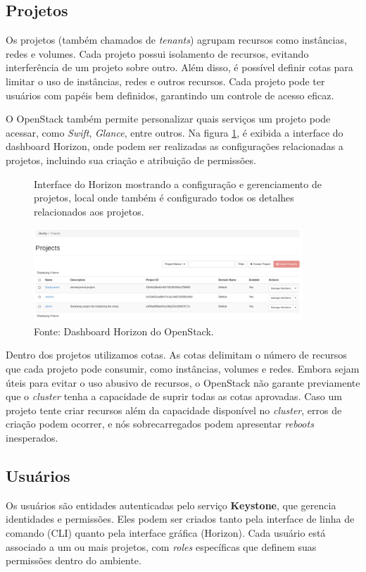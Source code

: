 \subsection{Projetos}
Os projetos (também chamados de \textit{tenants}) agrupam recursos como instâncias, redes e volumes. Cada projeto possui isolamento de recursos, evitando interferência de um projeto sobre outro. Além disso, é possível definir cotas para limitar o uso de instâncias, redes e outros recursos. Cada projeto pode ter usuários com papéis bem definidos, garantindo um controle de acesso eficaz.

O OpenStack também permite personalizar quais serviços um projeto pode acessar, como \textit{Swift}, \textit{Glance}, entre outros. Na figura \ref{fig:openstack_projects}, é exibida a interface do dashboard Horizon, onde podem ser realizadas as configurações relacionadas a projetos, incluindo sua criação e atribuição de permissões.

\begin{figure}[htbp]
    \centering
    \caption{Interface do Horizon mostrando a configuração e gerenciamento de projetos, local onde também é configurado todos os detalhes relacionados aos projetos.}
    \includegraphics[width=0.9\textwidth]{images/openstack_projects.png}
    \caption*{Fonte: Dashboard Horizon do OpenStack.}
    \label{fig:openstack_projects}
\end{figure}

Dentro dos projetos utilizamos cotas. As cotas delimitam o número de recursos que cada projeto pode consumir, como instâncias, volumes e redes. Embora sejam úteis para evitar o uso abusivo de recursos, o OpenStack não garante previamente que o \textit{cluster} tenha a capacidade de suprir todas as cotas aprovadas. Caso um projeto tente criar recursos além da capacidade disponível no \textit{cluster}, erros de criação podem ocorrer, e nós sobrecarregados podem apresentar \textit{reboots} inesperados.

\subsection{Usuários}
Os usuários são entidades autenticadas pelo serviço \textbf{Keystone}, que gerencia identidades e permissões. Eles podem ser criados tanto pela interface de linha de comando (CLI) quanto pela interface gráfica (Horizon). Cada usuário está associado a um ou mais projetos, com \textit{roles} específicas que definem suas permissões dentro do ambiente.

